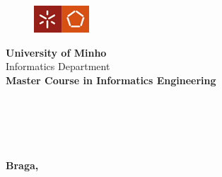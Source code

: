 
\makeatletter
\begin{titlepage}
\setcounter{page}{-1}
\thispagestyle{empty}

\begin{figure}[htbp]
\centering
    \includegraphics{Images/DI-UM.png}
\end{figure}

{\centering 
    {\large\textbf{University of Minho} \\ Informatics Department} \\
    \vspace{1cm}
    \textbf{Master Course in Informatics Engineering} \\

\vspace{5cm}

{\LARGE \textbf{\project}} \\
\vspace{1.5cm}
{\Large \textbf{\@title}} \\
\vspace {2cm}

{\large {\@author}} \\
\vspace{2cm}
}


\vspace {1.5cm}

\textbf{Braga, \@date} \\

\pagebreak

\end{titlepage}
\makeatother
